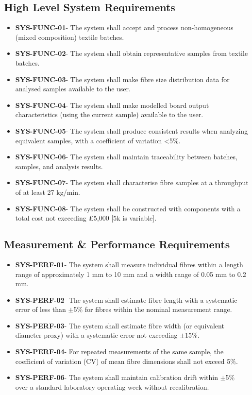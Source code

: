 \documentclass[a4paper, 12pt, english]{article}
\begin{document}
\subsection{High Level System Requirements}

\begin{itemize}
    \item \textbf{}\textbf{SYS-FUNC-01}- The system shall accept and process non-homogeneous (mixed composition) textile batches. 
    \item \textbf{SYS-FUNC-02}- The system shall obtain representative samples from textile batches. 
    \item \textbf{SYS-FUNC-03}- The system shall make fibre size distribution data for analysed samples available to the user. 
    \item \textbf{SYS-FUNC-04}- The system shall make modelled board output characteristics (using the current sample) available to the user. 
    \item \textbf{SYS-FUNC-05}- The system shall produce consistent results when analyzing equivalent samples, with a coefficient of variation <5\%. 
    \item \textbf{SYS-FUNC-06}- The system shall maintain traceability between batches, samples, and analysis results. 
    \item \textbf{SYS-FUNC-07}- The system shall characterise fibre samples at a throughput of at least 27 kg/min. 
    \item \textbf{SYS-FUNC-08}- The system shall be constructed with components with a total cost not exceeding £5,000 [5k is variable]. 
\end{itemize}

\subsection{Measurement \& Performance Requirements}

\begin{itemize}
    \item \textbf{SYS-PERF-01}- The system shall measure individual fibres within a length range of approximately 1 mm to 10 mm and a width range of 0.05 mm to 0.2 mm.

    \item \textbf{SYS-PERF-02}- The system shall estimate fibre length with a systematic error of less than $\pm$5\% for fibres within the nominal measurement range.

    \item \textbf{SYS-PERF-03}- The system shall estimate fibre width (or equivalent diameter proxy) with a systematic error not exceeding $\pm$15\%.

    \item \textbf{SYS-PERF-04}- For repeated measurements of the same sample, the coefficient of variation (CV) of mean fibre dimensions shall not exceed 5\%.

    \item \textbf{SYS-PERF-06}- The system shall maintain calibration drift within $\pm$5\% over a standard laboratory operating week without recalibration.
\end{itemize}
\end{document}
